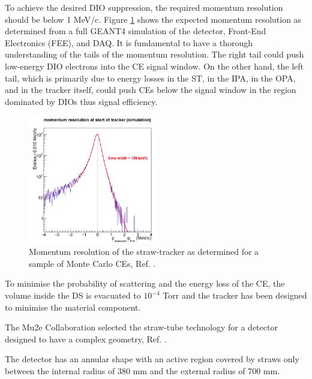 To achieve the desired DIO suppression, the required momentum resolution should be below 1 MeV/c.  
Figure \ref{fig:trkres} shows the expected momentum resolution as determined 
from a full GEANT4 simulation of the detector, Front-End Electronics (FEE), and  DAQ.
It is fundamental to have a thorough understanding of the tails of the momentum resolution. 
The right tail could push low-energy DIO electrons into the CE signal window. 
On the other hand, the left tail, which is primarily due to energy losses in the ST, 
in the IPA, in the OPA, and in the tracker itself, could 
push CEs below the signal window in the region dominated by DIOs 
thus  signal efficiency.
\begin{figure}[!h]
    \centering
    \includegraphics[width =0.5\textwidth]{figures/png/Screenshot_20240330_104830.png}
    \caption[The momentum resolution of the straw-tracker.]{Momentum resolution of the straw-tracker as determined for 
    a sample of Monte Carlo CEs, Ref. \cite{bobbb}.}
    \label{fig:trkres}
    \end{figure} 
To minimise the probability of scattering and the energy loss of the CE, 
the volume inside the DS is evacuated to $10^{-4}$ Torr 
and the tracker has been designed {\red to minimise the material component. }

The Mu2e Collaboration selected the straw-tube technology {\red for a detector 
designed to have a complex geometry}, Ref. \cite{bobbb}.

The detector has an annular shape with an active region covered by straws only between the 
internal radius of 380 mm and the external radius of 700 mm.  

